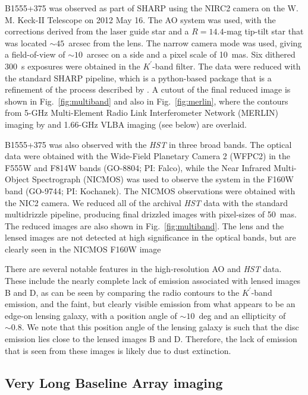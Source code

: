 \documentclass[a4paper,fleqn,usenatbib,useAMS]{mnras}
\begin{document}
B1555+375 was observed as part of SHARP using the NIRC2 camera on the W. M. Keck-II Telescope on 2012 May 16.  The AO system was used, with the corrections derived from the laser guide star and a $R=14.4$-mag tip-tilt star that was located $\sim45$~arcsec from the lens.  The narrow camera mode was used, giving a field-of-view of $\sim10$~arcsec on a side and a pixel scale of 10~mas. Six dithered 300~s exposures were obtained in the $K^{\prime}$-band filter.  The data were reduced with the standard SHARP pipeline, which is a python-based package that is a refinement of the process described by \citet{Auger_EELS1}.  A cutout of the final reduced image is shown in Fig.~\ref{fig:multiband} and also in Fig.~\ref{fig:merlin}, where the contours from 5-GHz Multi-Element Radio Link Interferometer Network (MERLIN) imaging by \citet{Marlow99} and 1.66-GHz VLBA imaging (see below) are overlaid.

B1555+375 was also observed with the {\it HST} in three broad bands.  The optical data were obtained with the Wide-Field Planetary Camera 2 (WFPC2) in the F555W and F814W bands (GO-8804; PI: Falco), while the Near Infrared Multi-Object Spectrograph (NICMOS) was used to observe the system in the F160W band (GO-9744; PI: Kochanek).  The NICMOS observations were obtained with the NIC2 camera.  We reduced all of the archival \textit{HST} data with the standard {\sc multidrizzle} pipeline, producing final drizzled images with pixel-sizes of 50~mas. The reduced images are also shown in Fig.~\ref{fig:multiband}. The lens and the lensed images are not detected at high significance in the optical bands, but are clearly seen in the NICMOS F160W image

There are several notable features in the high-resolution AO and {\it HST} data. These include the nearly complete lack of emission associated with lensed images B and D, as can be seen by comparing the radio contours to the $K^\prime$-band emission, and the faint, but clearly visible emission from what appears to be an edge-on lensing galaxy, with a position angle of $\sim 10$~deg and an ellipticity of $\sim 0.8$. We note that this position angle of the lensing galaxy is such that the disc emission lies close to the lensed images B and D. Therefore, the lack of emission that is seen from these images is likely due to dust extinction. 

\subsection{Very Long Baseline Array imaging}
\end{document}
